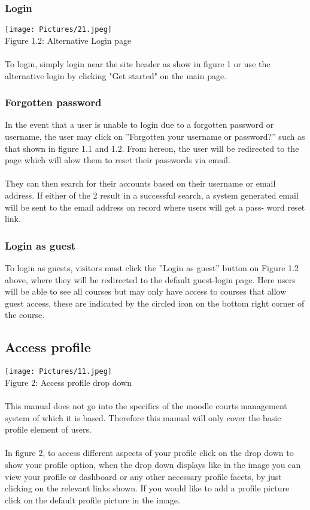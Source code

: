 \documentclass[english]{article}
\begin{document}
\subsubsection{Login}
\texttt{[image: Pictures/21.jpeg]} \\
Figure 1.2: Alternative Login page\\\\
To login, simply login near the site header as show in figure 1 or use the alternative login by clicking "Get started" on the main page.

\subsubsection{Forgotten password}
In the event that a user is unable to login due to a forgotten password or username, the user may click on ”Forgotten your username or password?” such as that shown in figure 1.1 and 1.2. From hereon, the user will be redirected to the page which will alow them to reset their passwords via email. \\\\
They can then search for their accounts based on their username or email address. If either of the 2 result in a successful search, a system generated email will be sent to the email address on record where users will get a pass- word reset link.	

\subsubsection{Login as guest}
To login as guests, visitors must click the ”Login as guest” button on Figure 1.2 above, where they will be redirected to the default guest-login page. Here users will be able to see all courses but may only have access to courses that allow guest access, these are indicated by the circled icon on the bottom right corner of the course.



		\subsection{Access profile}
\texttt{[image: Pictures/11.jpeg]} \\
Figure 2: Access profile drop down \\\\
This manual does not go into the specifics of the moodle courts management system of which it is based.
Therefore this manual will only cover the basic profile element of users. \\\\
In figure 2, to access different aspects of your profile click on the drop down to show your profile option, when the drop down displays like in the image you can view your profile or dashboard or any other necessary profile facets, by just clicking on the relevant links shown.
If you would like to add a profile picture click on the default profile picture in the image.
\end{document}
